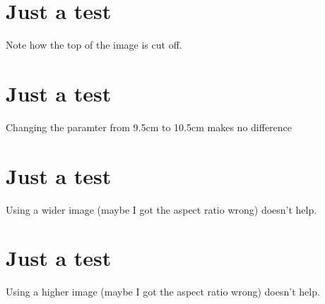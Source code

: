 \documentclass[
	a4paper,
	fontsize=10pt,
	twoside=false,
	numbers=noenddot,
]{kaobook}
\begin{document}
\mainmatter

\chapter{Just a test}

Note how the top of the image is cut off.

\chapter{Just a test}

Changing the paramter from 9.5cm to 10.5cm makes no difference

\chapter{Just a test}

Using a wider image (maybe I got the aspect ratio wrong) doesn't help.

\chapter{Just a test}

Using a higher image (maybe I got the aspect ratio wrong) doesn't help.
\end{document}
